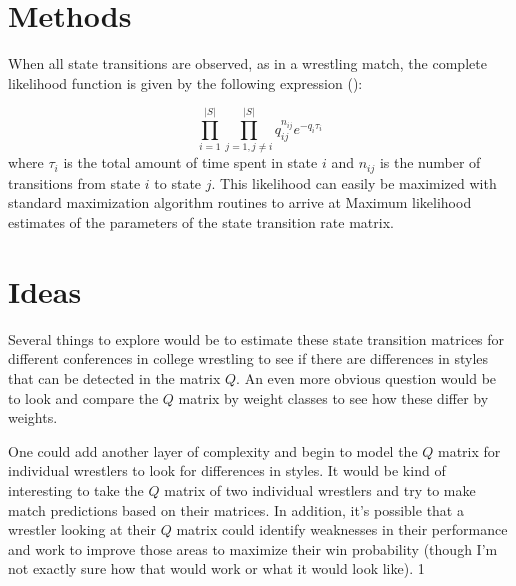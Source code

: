 \documentclass{article}\usepackage[]{graphicx}\usepackage[]{color}
\begin{document}
\section{Methods}
When all state transitions are observed, as in a wrestling match, the complete likelihood function is given by the following expression (\cite{Liu2015}):

$$
\prod_{i = 1}^{|S|}\prod_{j = 1,j\ne i}^{|S|} q_{ij}^{n_{ij}} e^{-q_i\tau_i}
$$
where $\tau_i$ is the total amount of time spent in state $i$ and $n_{ij}$ is the number of transitions from state $i$ to state $j$.  This likelihood can easily be maximized with standard maximization algorithm routines to arrive at Maximum likelihood estimates of the parameters of the state transition rate matrix.  

\section{Ideas}
Several things to explore would be to estimate these state transition matrices for different conferences in college wrestling to see if there are differences in styles that can be detected in the matrix $Q$.  An even more obvious question would be to look and compare the $Q$ matrix by weight classes to see how these differ by weights.  

One could add another layer of complexity and begin to model the $Q$ matrix for individual wrestlers to look for differences in styles.  It would be kind of interesting to take the $Q$ matrix of two individual wrestlers and try to make match predictions based on their matrices.  In addition, it's possible that a wrestler looking at their $Q$ matrix could identify weaknesses in their performance and work to improve those areas to maximize their win probability (though I'm not exactly sure how that would work or what it would look like).  1




\end{document}
